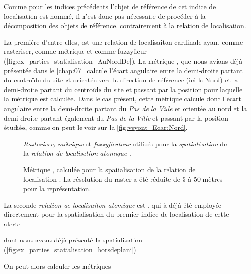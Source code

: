 Comme pour les indices précédents l'objet de référence de cet indice
de localisation est nommé, il n'est donc pas nécessaire de procéder à
la décomposition des objets de référence, contrairement à la relation
de localisation.

La première d'entre elles,  est une relation
de localisaiton cardinale ayant  comme
rasteriser,  comme métrique et
 comme fuzzyfieur
(\autoref{fig:ex_parties_statialisation_AuNordDe}). La métrique
, que nous avions déjà présentée dans le
\autoref{chap:07}, calcule l'écart angulaire entre la demi-droite
partant du centroïde du site et orientée vers la direction de
référence (ici le Nord) et la demi-droite partant du centroïde du
site et passant par la position pour laquelle la métrique est
calculée. Dans le cas présent, cette métrique calcule donc l'écart
angulaire entre la demi-droite partant du \emph{Pas de la Ville} et
orientée au nord et la demi-droite partant également du \emph{Pas de
  la Ville} et passant par la position étudiée, comme on peut le voir
sur la \autoref{fig:veyont_EcartNord}.

\begin{figure}
  \centering
  
  \caption{\emph{Rasteriser,} \emph{métrique} et \emph{fuzzyficateur}
    utilisés pour la \emph{spatialisation} de la \emph{relation de
      localisation atomique} \protect{}.}
  \label{fig:ex_parties_statialisation_AuNordDe}
\end{figure}

\begin{figure}
  \centering
  
  \caption{Métrique \protect{}, calculée
    pour la spatialisation de la relation de localisation
    \protect{}. La résolution du raster a
    été réduite de 5 à 50 mètres pour la représentation.}
  \label{fig:veyont_EcartNord}
\end{figure}

La seconde \emph{relation de localisaiton atomique} est
, qui à déjà été employée
directement pour la spatialisation du premier indice de localisation
de cette alerte.

dont nous avons déjà
présenté la spatialisation
(\autoref{fig:ex_parties_statialisation_horsdeplani})

On peut alors calculer les métriques


